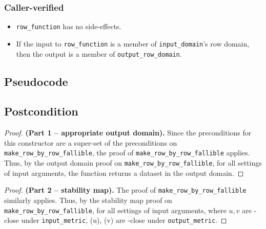\documentclass{article}
\begin{document}
\subsubsection*{Caller-verified}
\begin{itemize}
    \item \texttt{row\_function} has no side-effects.
    \item If the input to \texttt{row\_function} is a member of \texttt{input\_domain}'s row domain, then the output is a member of \texttt{output\_row\_domain}.
\end{itemize}

\subsection*{Pseudocode}


\subsection*{Postcondition}
\begin{theorem}
\end{theorem}
\begin{proof} \textbf{(Part 1 -- appropriate output domain).}
    Since the preconditions for this constructor are a super-set of the preconditions on \texttt{make\_row\_by\_row\_fallible},
    the proof of \texttt{make\_row\_by\_row\_fallible} applies.
    Thus, by the output domain proof on \texttt{make\_row\_by\_row\_fallible},
    for all settings of input arguments, the function returns a dataset in the output domain.
\end{proof}

\begin{proof} \textbf{(Part 2 -- stability map).}
    The proof of \texttt{make\_row\_by\_row\_fallible} similarly applies.
    Thus, by the stability map proof on \texttt{make\_row\_by\_row\_fallible},
    for all settings of input arguments,
    where $u, v$ are \din-close under \texttt{input\_metric},
    \function(u), \function(v) are \dout-close under \texttt{output\_metric}.
\end{proof}
\end{document}
